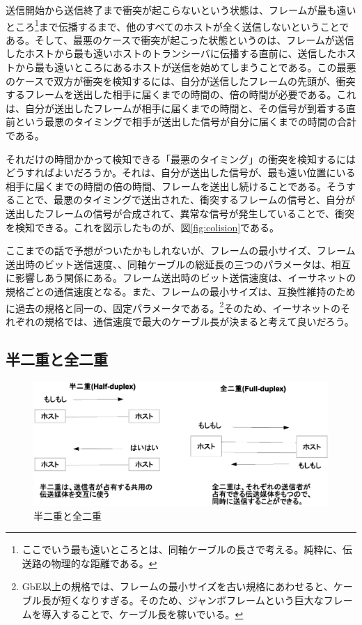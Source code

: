 送信開始から送信終了まで衝突が起こらないという状態は、フレームが最も遠いところ\footnote{ここでいう最も遠いところとは、同軸ケーブルの長さで考える。純粋に、伝送路の物理的な距離である。}まで伝播するまで、他のすべてのホストが全く送信しないということである。そして、最悪のケースで衝突が起こった状態というのは、フレームが送信したホストから最も遠いホストのトランシーバに伝播する直前に、送信したホストから最も遠いところにあるホストが送信を始めてしまうことである。この最悪のケースで双方が衝突を検知するには、自分が送信したフレームの先頭が、衝突するフレームを送出した相手に届くまでの時間の、倍の時間が必要である。これは、自分が送出したフレームが相手に届くまでの時間と、その信号が到着する直前という最悪のタイミングで相手が送出した信号が自分に届くまでの時間の合計である。

それだけの時間かかって検知できる「最悪のタイミング」の衝突を検知するにはどうすればよいだろうか。それは、自分が送出した信号が、最も遠い位置にいる相手に届くまでの時間の倍の時間、フレームを送出し続けることである。そうすることで、最悪のタイミングで送出された、衝突するフレームの信号と、自分が送出したフレームの信号が合成されて、異常な信号が発生していることで、衝突を検知できる。これを図示したものが、図\ref{fig:colision}である。

ここまでの話で予想がついたかもしれないが、フレームの最小サイズ、フレーム送出時のビット送信速度、、同軸ケーブルの総延長の三つのパラメータは、相互に影響しあう関係にある。フレーム送出時のビット送信速度は、イーサネットの規格ごとの通信速度となる。また、フレームの最小サイズは、互換性維持のために過去の規格と同一の、固定パラメータである。\footnote{GbE以上の規格では、フレームの最小サイズを古い規格にあわせると、ケーブル長が短くなりすぎる。そのため、ジャンボフレームという巨大なフレームを導入することで、ケーブル長を稼いでいる。}そのため、イーサネットのそれぞれの規格では、通信速度で最大のケーブル長が決まると考えて良いだろう。

\subsection{半二重と全二重}

\begin{figure}[htbp]
	\includegraphics[width=12cm,clip]{draw/duplex.eps}
	\caption{半二重と全二重}
	\label{fig:duplex}
\end{figure}

